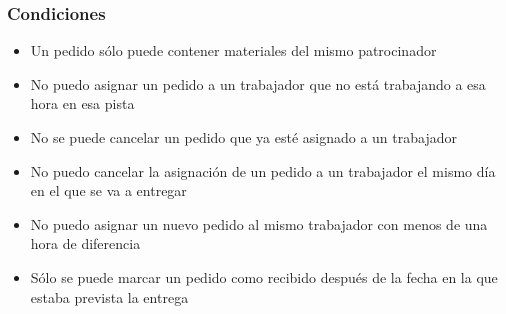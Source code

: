 \subsubsection{Condiciones}
\begin{itemize}
	\item Un pedido sólo puede contener materiales del mismo patrocinador
	\item No puedo asignar un pedido a un trabajador que no está trabajando a esa hora en esa pista
	\item No se puede cancelar un pedido que ya esté asignado a un trabajador
	\item No puedo cancelar la asignación de un pedido a un trabajador el mismo día en el que se va a entregar
	\item No puedo asignar un nuevo pedido al mismo trabajador con menos de una hora de diferencia
	\item Sólo se puede marcar un pedido como recibido después de la fecha en la que estaba prevista la entrega
\end{itemize}

